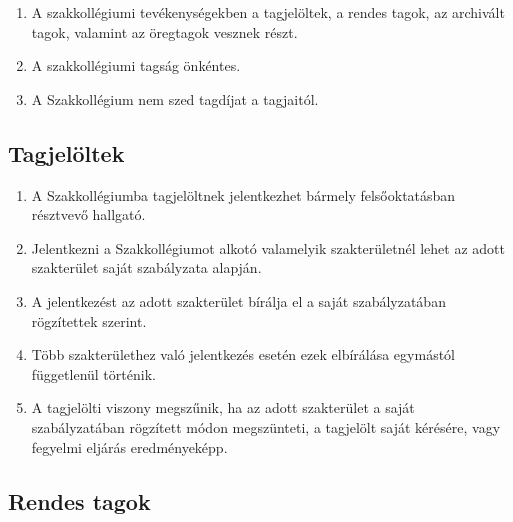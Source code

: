 \documentclass[12pt]{report}
\begin{document}
\begin{enumerate}
  \item A szakkollégiumi tevékenységekben a tagjelöltek, a rendes tagok, az archivált tagok, valamint az öregtagok vesznek részt.
  \item A szakkollégiumi tagság önkéntes.
  \item A Szakkollégium nem szed tagdíjat a tagjaitól.
\end{enumerate}

\subsection{Tagjelöltek}

\begin{enumerate}
  \item A Szakkollégiumba tagjelöltnek jelentkezhet bármely felsőoktatásban résztvevő hallgató.
  \item Jelentkezni a Szakkollégiumot alkotó valamelyik szakterületnél lehet az adott szakterület saját szabályzata alapján.
  \item A jelentkezést az adott szakterület bírálja el a saját szabályzatában rögzítettek szerint.
  \item Több szakterülethez való jelentkezés esetén ezek elbírálása egymástól függetlenül történik.
  \item A tagjelölti viszony megszűnik, ha az adott szakterület a saját szabályzatában rögzített módon megszünteti, a tagjelölt saját kérésére, vagy fegyelmi eljárás eredményeképp.
\end{enumerate}

\subsection{Rendes tagok} \label{subsec_member}
\end{document}
